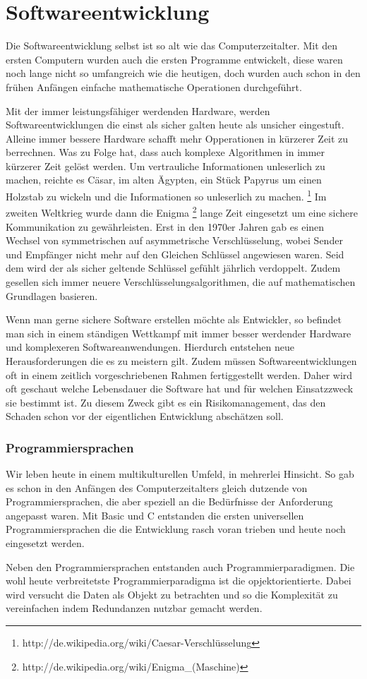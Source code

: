\section{Softwareentwicklung}\label{entwicklung}

Die Softwareentwicklung selbst ist so alt wie das Computerzeitalter. 
Mit den ersten Computern wurden auch die ersten Programme entwickelt,
diese waren noch lange nicht so umfangreich wie die heutigen, doch wurden
auch schon in den frühen Anfängen einfache mathematische Operationen durchgeführt. 

Mit der immer leistungsfähiger werdenden Hardware, werden Softwareentwicklungen
die einst als sicher galten heute als unsicher eingestuft. Alleine immer
bessere Hardware schafft mehr Opperationen in kürzerer Zeit zu berrechnen.
Was zu Folge hat, dass auch komplexe Algorithmen in immer kürzerer Zeit
gelöst werden.  
Um vertrauliche Informationen unleserlich zu machen, reichte es Cäsar, 
im alten Ägypten, ein Stück Papyrus um einen Holzstab zu wickeln und
die Informationen so unleserlich zu machen. 
\footnote[1]{http://de.wikipedia.org/wiki/Caesar-Verschlüsselung} 
Im zweiten Weltkrieg wurde dann die Enigma \footnote[2]{http://de.wikipedia.org/wiki/Enigma_(Maschine)} 
lange Zeit eingesetzt um eine sichere Kommunikation zu gewährleisten. 
Erst in den 1970er Jahren gab es einen Wechsel von symmetrischen auf 
asymmetrische Verschlüsselung, wobei Sender und Empfänger nicht mehr auf 
den Gleichen Schlüssel angewiesen waren. Seid dem wird der als sicher
geltende Schlüssel gefühlt jährlich verdoppelt. Zudem gesellen sich immer
neuere Verschlüsselungsalgorithmen, die auf mathematischen Grundlagen basieren. 

Wenn man gerne sichere Software erstellen möchte als Entwickler, so 
befindet man sich in einem ständigen Wettkampf mit immer besser werdender 
Hardware und komplexeren Softwareanwendungen. Hierdurch entstehen neue 
Herausforderungen die es zu meistern gilt. 
Zudem müssen Softwareentwicklungen oft in einem zeitlich vorgeschriebenen 
Rahmen fertiggestellt werden. Daher wird oft geschaut welche Lebensdauer 
die Software hat und für welchen Einsatzzweck sie bestimmt ist. Zu diesem 
Zweck gibt es ein Risikomanagement, das den Schaden schon vor der eigentlichen
Entwicklung abschätzen soll.

\subsubsection{Programmiersprachen}
Wir leben heute in einem multikulturellen Umfeld, in mehrerlei Hinsicht.
So gab es schon in den Anfängen des Computerzeitalters gleich dutzende 
von Programmiersprachen, die aber speziell an die Bedürfnisse der Anforderung
angepasst waren. Mit Basic und C entstanden die ersten universellen
Programmiersprachen die die Entwicklung rasch voran trieben und heute 
noch eingesetzt werden. 

Neben den Programmiersprachen entstanden auch Programmierparadigmen.
Die wohl heute verbreitetste Programmierparadigma ist die opjektorientierte.
Dabei wird versucht die Daten als Objekt zu betrachten und so die 
Komplexität zu vereinfachen indem Redundanzen nutzbar gemacht werden.

 

  

 
